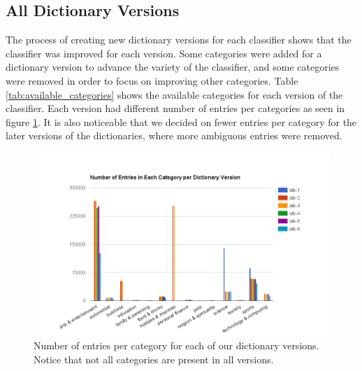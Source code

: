 \subsection{All Dictionary Versions}
The process of creating new dictionary versions for each classifier shows that the classifier was improved for each version. Some categories were added for a dictionary version to advance the variety of the classifier, and some categories were removed in order to focus on improving other categories. Table \ref{tab:available_categories} shows the available categories for each version of the classifier. Each version had different number of entries per categories as seen in figure \ref{fig:numberofentriespercat}. It is also noticeable that we decided on fewer entries per category for the later versions of the dictionaries, where more ambiguous entries were removed.  


\begin{figure}[h]
\centering
\includegraphics[width=\textwidth]{Chapters/Results/Numberofentriespercat}
\caption[Number of entries per category for each dictionary version]{Number of entries per category for each of our dictionary versions. Notice that not all categories are present in all versions.}
\label{fig:numberofentriespercat}
\end{figure}

